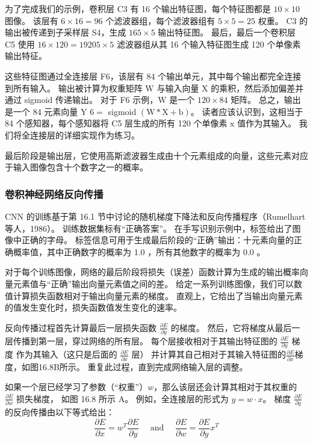 为了完成我们的示例，卷积层 C3 有 16 个输出特征图，每个特征图都是 $10 × 10$ 图像。 
该层有 $6 \times 16=96$ 个滤波器组，每个滤波器组有 $5 \times 5=25$ 权重。 
$\mathrm{C} 3$ 的输出被传递到子采样层 S4，生成 $165 \times 5$ 输出特征图。 
最后，最后一个卷积层 C5 使用 $16 × 120=19205 \times 5$ 滤波器组从其 16 个输入特征图生成 120 个单像素输出特征。

这些特征图通过全连接层 F6，该层有 84 个输出单元，其中每个输出都完全连接到所有输入。 
输出被计算为权重矩阵 $\mathrm{W}$ 与输入向量 $\mathrm{X}$ 的乘积，然后添加偏差并通过 sigmoid 传递输出。 
对于 F6 示例，$\mathrm{W}$ 是一个 $120 \times 84$ 矩阵。 
总之，输出是一个 84 元素向量 Y $6=$ sigmoid $(\mathrm{W} * \mathrm{X}+\mathrm{b})$。 
读者应该认识到，这相当于 84 个感知器，每个感知器将 C5 层生成的所有 120 个单像素 $\mathrm{x}$ 值作为其输入。 
我们将全连接层的详细实现作为练习。

最后阶段是输出层，它使用高斯滤波器生成由十个元素组成的向量，这些元素对应于输入图像包含十个数字之一的概率。

\subsubsection{卷积神经网络反向传播}
CNN 的训练基于第 16.1 节中讨论的随机梯度下降法和反向传播程序（Rumelhart 等人，1986）。 训练数据集标有“正确答案”。 
在手写识别示例中，标签给出了图像中正确的字母。 
标签信息可用于生成最后阶段的“正确”输出：十元素向量的正确概率值，其中正确数字的概率为 1.0 ，所有其他数字的概率为 0.0 。

对于每个训练图像，网络的最后阶段将损失（误差）函数计算为生成的输出概率向量元素值与“正确”输出向量元素值之间的差。 
给定一系列训练图像，我们可以数值计算损失函数相对于输出向量元素的梯度。 
直观上，它给出了当输出向量元素的值发生变化时，损失函数值发生变化的速率。

反向传播过程首先计算最后一层损失函数 $\frac{\partial E}{\partial y}$ 的梯度。 
然后，它将梯度从最后一层传播到第一层，穿过网络的所有层。 
每个层接收相对于其输出特征图的 $\frac{\partial E}{\partial y}$ 梯度
作为其输入（这只是后面的 $\frac{\partial E}{\partial x}$ 层）
并计算其自己相对于其输入特征图的$\frac{\partial E}{\partial x}$梯度，如图16.8B所示。 
重复此过程，直到完成网络输入层的调整。

如果一个层已经学习了参数（“权重”）$w$，那么该层还会计算其相对于其权重的 $\frac{\partial E}{\partial w}$ 损失梯度，
如图 16.8 所示 A。 例如，全连接层的形式为 $y=w \cdot x$。 
梯度 $\frac{\partial E}{\partial y}$ 的反向传播由以下等式给出：
$$
\frac{\partial E}{\partial x}=w^{T} \frac{\partial E}{\partial y} \quad \text { and } \quad \frac{\partial E}{\partial w}=\frac{\partial E}{\partial y} x^{T}
$$

